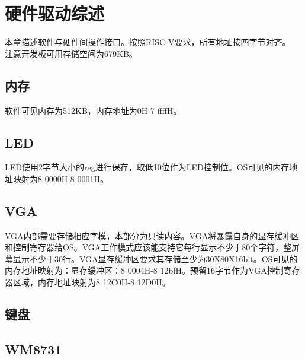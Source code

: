 %
% 
% 
% 
% 
% 
% 
%

\chapter{硬件驱动综述}
本章描述软件与硬件间操作接口。按照RISC-V要求，所有地址按四字节对齐。\\
注意开发板可用存储空间为679KB。
\section{内存}
软件可见内存为512KB，内存地址为0H-7 ffffH。
\section{LED}
LED使用2字节大小的reg进行保存，取低10位作为LED控制位。OS可见的内存地址映射为8 0000H-8 0001H。
\section{VGA}
VGA内部需要存储相应字模，本部分为只读内容。VGA将暴露自身的显存缓冲区和控制寄存器给OS。VGA工作模式应该能支持它每行显示不少于80个字符，整屏幕显示不少于30行。VGA显存缓冲区要求其存储至少为30X80X16bit。OS可见的内存地址映射为：显存缓冲区：8 0004H-8 12bfH。预留16字节作为VGA控制寄存器区域，内存地址映射为8 12C0H-8 12D0H。
\section{键盘}
\section{WM8731}
